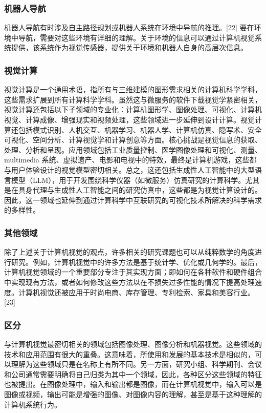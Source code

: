 \subsubsection{机器人导航}  
机器人导航有时涉及自主路径规划或机器人系统在环境中导航的推理。[22] 要在环境中导航，需要对这些环境有详细的理解。关于环境的信息可以通过计算机视觉系统提供，该系统作为视觉传感器，提供关于环境和机器人自身的高层次信息。
\subsubsection{视觉计算}  
视觉计算是一个通用术语，指所有与三维建模的图形需求相关的计算机科学学科，这些需求扩展到所有计算科学学科。虽然这与微服务的软件下载视觉学紧密相关，视觉计算还包括以下子领域的专业化：计算机图形学、图像处理、可视化、计算机视觉、计算成像、增强现实和视频处理，这些领域进一步延伸到设计计算。视觉计算还包括模式识别、人机交互、机器学习、机器人学、计算机仿真、隐写术、安全可视化、空间分析、计算视觉学和计算创意等方面。核心挑战是视觉信息的获取、处理、分析和呈现。应用领域包括工业质量控制、医学图像处理和可视化、测量、 multimedia 系统、虚拟遗产、电影和电视中的特效，最终是计算机游戏，这些都与用户体验设计的视觉模型密切相关。总之，这还包括生成性人工智能中的大型语言模型（LLM），用于开发围绕科学仪器（如微服务）仿真研究的计算科学。尤其是在具身代理与生成性人工智能之间的研究仿真中，这些都是为视觉计算设计的。因此，这一领域也延伸到通过计算科学中互联研究的可视化技术所解决的科学需求的多样性。
\subsubsection{其他领域}  
除了上述关于计算机视觉的观点，许多相关的研究课题也可以从纯粹数学的角度进行研究。例如，计算机视觉中的许多方法是基于统计学、优化或几何学的。最后，计算机视觉领域的一个重要部分专注于其实现方面；即如何在各种软件和硬件组合中实现现有方法，或者如何修改这些方法以在不损失过多性能的情况下提高处理速度。计算机视觉还被应用于时尚电商、库存管理、专利检索、家具和美容行业。[23]
\subsubsection{区分}  
与计算机视觉最密切相关的领域包括图像处理、图像分析和机器视觉。这些领域的技术和应用范围有很大的重叠。这意味着，所使用和发展的基本技术是相似的，可以理解为这些领域只是在名称上有所不同。另一方面，研究小组、科学期刊、会议和公司通常需要明确将自己归类为其中一个领域，因此，各种区分这些领域的特征也被提出。在图像处理中，输入和输出都是图像，而在计算机视觉中，输入可以是图像或视频，输出可能是增强的图像、对图像内容的理解，甚至是基于这种理解的计算机系统行为。

